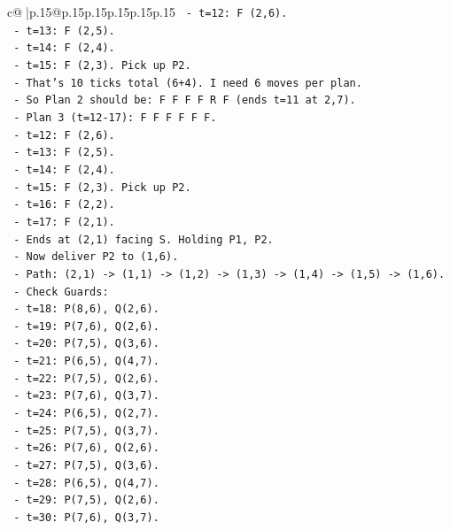 \documentclass{article}
\begin{document}
{\begin{supertabular}{c@{$\;$}|p{.15\linewidth}@{}p{.15\linewidth}p{.15\linewidth}p{.15\linewidth}p{.15\linewidth}p{.15\linewidth}}
{{{\texttt{      {-} t=12: F (2,6).} \\
\texttt{      {-} t=13: F (2,5).} \\
\texttt{      {-} t=14: F (2,4).} \\
\texttt{      {-} t=15: F (2,3). Pick up P2.} \\
\texttt{      {-} That's 10 ticks total (6+4). I need 6 moves per plan.} \\
\texttt{      {-} So Plan 2 should be: F F F F R F (ends t=11 at 2,7).} \\
\texttt{      {-} Plan 3 (t=12{-}17): F F F F F F.} \\
\texttt{        {-} t=12: F (2,6).} \\
\texttt{        {-} t=13: F (2,5).} \\
\texttt{        {-} t=14: F (2,4).} \\
\texttt{        {-} t=15: F (2,3). Pick up P2.} \\
\texttt{        {-} t=16: F (2,2).} \\
\texttt{        {-} t=17: F (2,1).} \\
\texttt{      {-} Ends at (2,1) facing S. Holding P1, P2.} \\
\texttt{    {-} Now deliver P2 to (1,6).} \\
\texttt{    {-} Path: (2,1) {-}> (1,1) {-}> (1,2) {-}> (1,3) {-}> (1,4) {-}> (1,5) {-}> (1,6).} \\
\texttt{    {-} Check Guards:} \\
\texttt{      {-} t=18: P(8,6), Q(2,6).} \\
\texttt{      {-} t=19: P(7,6), Q(2,6).} \\
\texttt{      {-} t=20: P(7,5), Q(3,6).} \\
\texttt{      {-} t=21: P(6,5), Q(4,7).} \\
\texttt{      {-} t=22: P(7,5), Q(2,6).} \\
\texttt{      {-} t=23: P(7,6), Q(3,7).} \\
\texttt{      {-} t=24: P(6,5), Q(2,7).} \\
\texttt{      {-} t=25: P(7,5), Q(3,7).} \\
\texttt{      {-} t=26: P(7,6), Q(2,6).} \\
\texttt{      {-} t=27: P(7,5), Q(3,6).} \\
\texttt{      {-} t=28: P(6,5), Q(4,7).} \\
\texttt{      {-} t=29: P(7,5), Q(2,6).} \\
\texttt{      {-} t=30: P(7,6), Q(3,7).} \\
}}}
\end{supertabular}}
\end{document}
